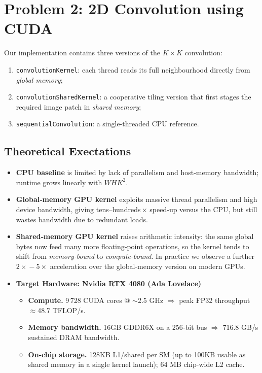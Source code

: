 \section{Problem 2: 2D Convolution using CUDA}
\label{sec:cuda_intro}

Our implementation contains three versions of the \(K\times K\) convolution:

\begin{enumerate}
  \item \texttt{convolutionKernel}: each thread reads its full neighbourhood directly from \emph{global memory};
  \item \texttt{convolutionSharedKernel}: a cooperative tiling version that first stages the required image patch in \emph{shared memory};
  \item \texttt{sequentialConvolution}: a single-threaded CPU reference.  
\end{enumerate}

\subsection{Theoretical Exectations}
\label{ssec:perf_expect}

\begin{itemize}
  \item \textbf{CPU baseline} is limited by lack of parallelism and
        host‑memory bandwidth; runtime grows linearly with
        \(W\!H K^2\).
  \item \textbf{Global‑memory GPU kernel} exploits massive thread
        parallelism and high device bandwidth, giving tens–hundreds\,×
        speed‑up versus the CPU, but still wastes bandwidth due to
        redundant loads. \parencite{nvidia2025ada}
  \item \textbf{Shared‑memory GPU kernel} raises arithmetic intensity:
        the same global bytes now feed many more floating‑point
        operations, so the kernel tends to shift from
        \emph{memory‑bound} to \emph{compute-bound}.  In practice we
        observe a further \(2\!\times\!-5\!\times\) acceleration over
        the global‑memory version on modern GPUs. \parencite{nvidia2025ada}
  \item \textbf{Target Hardware: Nvidia RTX 4080 (Ada Lovelace)} 

  \begin{itemize}
    \item \textbf{Compute.} 9\,728 CUDA cores @ $\sim$2.5 GHz  
          $\Rightarrow$ peak FP32 throughput $\approx$48.7 TFLOP/s. \parencite{techpowerup2025rtx4080}
    \item \textbf{Memory bandwidth.} 16GB GDDR6X on a 256‑bit bus  
          $\Rightarrow$ 716.8 GB/s sustained DRAM bandwidth.
    \item \textbf{On-chip storage.} 128KB L1/shared per SM  
          (up to 100KB usable as shared memory in a single kernel launch);  
          64 MB chip-wide L2 cache. \parencite{techpowerup2025rtx4080}
  \end{itemize}
\end{itemize}


